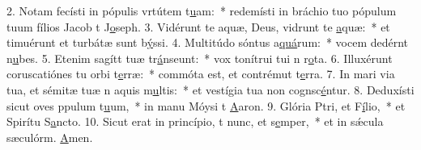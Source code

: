 2. Notam fecísti in pópulis vrtútem t\uline{u}am:~* redemísti in bráchio tuo pópulum tuum fílios Jacob t J\uline{o}seph.
3. Vidérunt te aquæ, Deus, vidrunt te \uline{a}quæ:~* et timuérunt et turbátæ sunt b\uline{ý}ssi.
4. Multitúdo sóntus a\uline{quá}rum:~* vocem dedérnt n\uline{u}bes.
5. Etenim sagítt tuæ tr\uline{á}nseunt:~* vox tonítrui tui n r\uline{o}ta.
6. Illuxérunt coruscatiónes tu orbi t\uline{e}rræ:~* commóta est, et contrémut t\uline{e}rra.
7. In mari via tua, et sémitæ tuæ n aquis m\uline{u}ltis:~* et vestígia tua non cognsc\uline{é}ntur.
8. Deduxísti sicut oves ppulum t\uline{u}um,~* in manu Móysi t \uline{A}aron.
9. Glória Ptri, et F\uline{í}lio,~* et Spirítu S\uline{a}ncto.
10. Sicut erat in princípio, t nunc, et s\uline{e}mper,~* et in sǽcula sæculórm. \uline{A}men.
